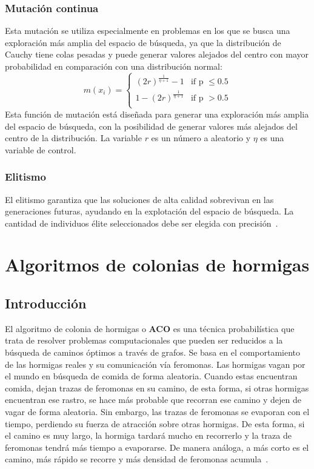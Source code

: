 \subsubsection{Mutación continua}
Esta mutación se utiliza especialmente en problemas en los que se busca una exploración más amplia del espacio de búsqueda, ya que la distribución de Cauchy tiene colas pesadas y puede generar valores alejados del centro con mayor probabilidad en comparación con una distribución normal:
\begin{equation}
    m(x_i) =
    \begin{cases}
        (2r)^{\frac{1}{\eta+1}}-1 & \text{if p $\leq 0.5$} \\
        1-(2r)^{\frac{1}{\eta+1}} & \text{if p $> 0.5$}    \\
    \end{cases}
\end{equation}
Esta función de mutación está diseñada para generar una exploración más amplia del espacio de búsqueda, con la posibilidad de generar valores más alejados del centro de la distribución. La variable $r$ es un número a aleatorio y $\eta$ es una variable de control.

\subsubsection{Elitismo}
El elitismo garantiza que las soluciones de alta calidad sobrevivan en las generaciones futuras, ayudando en la explotación del espacio de búsqueda. La cantidad de individuos élite seleccionados debe ser elegida con precisión~\cite{mirjalili2019genetic}.

\section{Algoritmos de colonias de hormigas}
\subsection{Introducción}
El algoritmo de colonia de hormigas o \textbf{ACO} es una técnica probabilística que trata de resolver problemas computacionales que pueden ser reducidos a la búsqueda de caminos óptimos a través de grafos. Se basa en el comportamiento de las hormigas reales y su comunicación vía feromonas. Las hormigas vagan por el mundo en búsqueda de comida de forma aleatoria. Cuando estas encuentran comida, dejan trazas de feromonas en su camino, de esta forma, si otras hormigas encuentran ese rastro, se hace más probable que recorran ese camino y dejen de vagar de forma aleatoria. Sin embargo, las trazas de feromonas se evaporan con el tiempo, perdiendo su fuerza de atracción sobre otras hormigas. De esta forma, si el camino es muy largo, la hormiga tardará mucho en recorrerlo y la traza de feromonas tendrá más tiempo a evaporarse. De manera análoga, a más corto es el camino, más rápido se recorre y más densidad de feromonas acumula~\cite{kashef_advanced_2015}.

